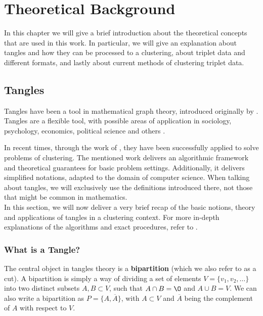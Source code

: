 \chapter{Theoretical Background}\label{theory}
In this chapter we will give a brief introduction about the theoretical concepts that are used in this work. In particular, we will
give an explanation about tangles and how they can be processed to a clustering, about triplet data and different formats, and lastly about
current methods of clustering triplet data.

\section{Tangles}\label{theory:tangles}
Tangles have been a tool in mathematical graph theory, introduced originally by \cite{robertsonGraphMinorsObstructions1991}. 
Tangles are a flexible tool, with possible areas of application in sociology, psychology, economics, political science and others \citep{diestelTanglesSocialSciences2019}.

In recent times, through the work of \cite{klepperClusteringTanglesAlgorithmic2021}, they have been successfully applied
to solve problems of clustering. The mentioned work delivers an algorithmic framework and theoretical guarantees for basic problem settings.
Additionally, it delivers simplified notations, adapted to the domain of computer science. When talking about tangles,
we will exclusively use the definitions introduced there, not those that might be common in mathematics. \\

In this section, we will now deliver a very brief recap of the basic notions, theory and applications of tangles in a clustering context.
For more in-depth explanations of the algorithms and exact procedures, refer to \cite{klepperClusteringTanglesAlgorithmic2021}.
\subsection{What is a Tangle?}
The central object in tangles theory is a \textbf{bipartition} (which we also refer to as a cut). 
A bipartition is simply a way of dividing a set of elements $V =  \{ v_1, v_2, \ldots \}$ into two distinct subsets $A, B \subset V$, such that
$A \cap B = \O$ and $A \cup B = V$. We can also write a bipartition as $P = \{A, \overline{A}\}$, with $A \subset V$ and $\overline{A}$ being the
complement of $A$ with respect to $V$. \\

